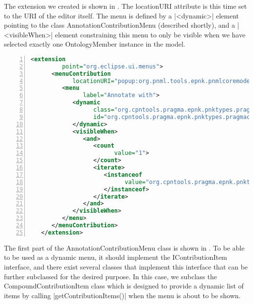 	The extension we created is shown in
	. The locationURI attribute is this time set to the URI
	of the editor itself. The menu is defined by a |<dynamic>| element pointing
	to the class AnnotationContributionMenu (described shortly), and a
	|<visibleWhen>| element constraining this menu to only be visible when we have
	selected exactly one OntologyMember instance in the model.
	
	\begin{lstlisting}[language=XML,float,label=lst:addPragmaMenu,numbers=left,stepnumber=1,
	caption=Add OntologyPragmatic Dynamic Menu Extension]
   <extension
         point="org.eclipse.ui.menus">
      <menuContribution
            locationURI="popup:org.pnml.tools.epnk.pnmlcoremodel.presentation.PnmlcoremodelEditorPNML?before=additions">
         <menu
               label="Annotate with">
            <dynamic
                  class="org.cpntools.pragma.epnk.pnktypes.pragmacpndefinition.menu.AnnotationContributionMenu"
                  id="org.cpntools.pragma.epnk.pnktypes.pragmacpndefinition.menu.AnnotationContributionMenu">
            </dynamic>
            <visibleWhen>
               <and>
                  <count
                        value="1">
                  </count>
                  <iterate>
                     <instanceof
                           value="org.cpntools.pragma.epnk.pnktypes.pragmacpndefinition.OntologyMember">
                     </instanceof>
                  </iterate>
               </and>
            </visibleWhen>
         </menu>
      </menuContribution>
   </extension>
	\end{lstlisting}
	
	The first part of the AnnotationContributionMenu class is shown in
	. To be able to be used as a dynamic menu,
	it should implement the IContributionItem interface, and there exist several
	classes that implement this interface that can be further subclassed for the
	desired purpose. In this case, we subclass the CompoundContributionItem class
	which is designed to provide a dynamic list of items by calling 
	|getContributionItems()| when the menu is about to be shown.
	
